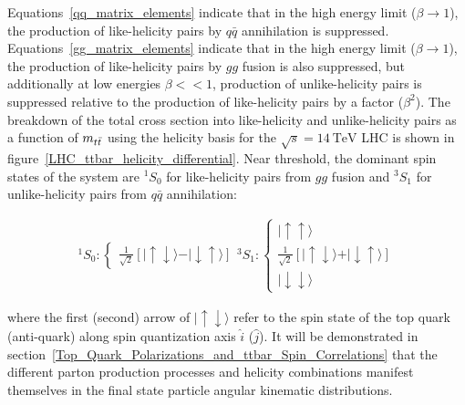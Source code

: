 Equations~\ref{qq_matrix_elements} indicate that in the high energy limit ($\beta \rightarrow 1$), the production of like-helicity \ttbar pairs by $q\bar{q}$ annihilation is suppressed.
Equations~\ref{gg_matrix_elements} indicate that in the high energy limit ($\beta \rightarrow 1$), the production of like-helicity \ttbar pairs by $gg$ fusion is also suppressed, but additionally at low energies $\beta << 1$, production of unlike-helicity \ttbar pairs is suppressed relative to the production of like-helicity pairs by a factor ($\beta^2$).
The breakdown of the total \ttbar cross section into like-helicity and unlike-helicity pairs as a function of $m_{t\bar{t}}$ using the helicity basis for the $\sqrt{s}=\SI{14}{\TeV}$ LHC is shown in figure~\ref{LHC_ttbar_helicity_differential}.
Near threshold, the dominant spin states of the \ttbar system are ${}^{1}S_{0}$ for like-helicity \ttbar pairs from $gg$ fusion and ${}^{3}S_1$ for unlike-helicity \ttbar pairs from $q\bar{q}$ annihilation:
\begin{linenomath*}
\begin{align}
{}^{1}S_{0} :
\begin{cases}
\frac{1}{\sqrt{2}}[\vert \uparrow \downarrow \rangle - \vert \downarrow \uparrow \rangle]
\end{cases}
{}^{3}S_1 :
\begin{cases} 
\vert \uparrow \uparrow \rangle \\
\frac{1}{\sqrt{2}}[\vert \uparrow \downarrow \rangle + \vert \downarrow \uparrow \rangle] \\
\vert \downarrow \downarrow \rangle 
\end{cases}
\end{align}
\end{linenomath*}
where the first (second) arrow of $\vert \uparrow \downarrow \rangle$ refer to the spin state of the top quark (anti-quark) along spin quantization axis $\hat{i}$ ($\hat{j}$).
It will be demonstrated in section~\ref{Top_Quark_Polarizations_and_ttbar_Spin_Correlations} that the different parton production processes and helicity combinations manifest themselves in the \ttbar final state particle angular kinematic distributions.
